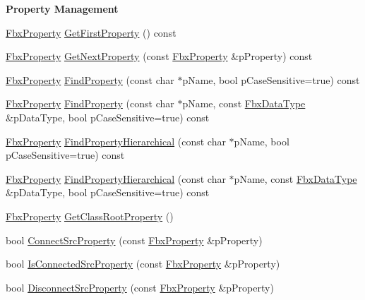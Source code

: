\begin{Indent}\textbf{ Property Management}\par
\begin{DoxyCompactItemize}
\item 
\hyperlink{class_fbx_property}{Fbx\+Property} \hyperlink{class_fbx_object_abc7d6efa0f0b7f0037818b8700465077}{Get\+First\+Property} () const
\item 
\hyperlink{class_fbx_property}{Fbx\+Property} \hyperlink{class_fbx_object_a34e7ffc0f49a4e3be8db6310efccd020}{Get\+Next\+Property} (const \hyperlink{class_fbx_property}{Fbx\+Property} \&p\+Property) const
\item 
\hyperlink{class_fbx_property}{Fbx\+Property} \hyperlink{class_fbx_object_a697319ff157f50b097f49118f5582f98}{Find\+Property} (const char $\ast$p\+Name, bool p\+Case\+Sensitive=true) const
\item 
\hyperlink{class_fbx_property}{Fbx\+Property} \hyperlink{class_fbx_object_aab369c8ec541c9e6994a28015619e510}{Find\+Property} (const char $\ast$p\+Name, const \hyperlink{class_fbx_data_type}{Fbx\+Data\+Type} \&p\+Data\+Type, bool p\+Case\+Sensitive=true) const
\item 
\hyperlink{class_fbx_property}{Fbx\+Property} \hyperlink{class_fbx_object_ac20a46bd7abf3c09fc2af0df47f4f261}{Find\+Property\+Hierarchical} (const char $\ast$p\+Name, bool p\+Case\+Sensitive=true) const
\item 
\hyperlink{class_fbx_property}{Fbx\+Property} \hyperlink{class_fbx_object_a47b6379edc68313f2b23da3d3b36e5ab}{Find\+Property\+Hierarchical} (const char $\ast$p\+Name, const \hyperlink{class_fbx_data_type}{Fbx\+Data\+Type} \&p\+Data\+Type, bool p\+Case\+Sensitive=true) const
\item 
\hyperlink{class_fbx_property}{Fbx\+Property} \hyperlink{class_fbx_object_a70e190147f28712dee1ec1e00b73c24e}{Get\+Class\+Root\+Property} ()
\item 
bool \hyperlink{class_fbx_object_aef0b1c0672a044b6e44c824b9469c7e7}{Connect\+Src\+Property} (const \hyperlink{class_fbx_property}{Fbx\+Property} \&p\+Property)
\item 
bool \hyperlink{class_fbx_object_a7f2c8c668ac8e009584c12f19809be22}{Is\+Connected\+Src\+Property} (const \hyperlink{class_fbx_property}{Fbx\+Property} \&p\+Property)
\item 
bool \hyperlink{class_fbx_object_a545423b1e5060fcad8784bd0aa0432b6}{Disconnect\+Src\+Property} (const \hyperlink{class_fbx_property}{Fbx\+Property} \&p\+Property)
\item 

\end{DoxyCompactItemize}
\end{Indent}
